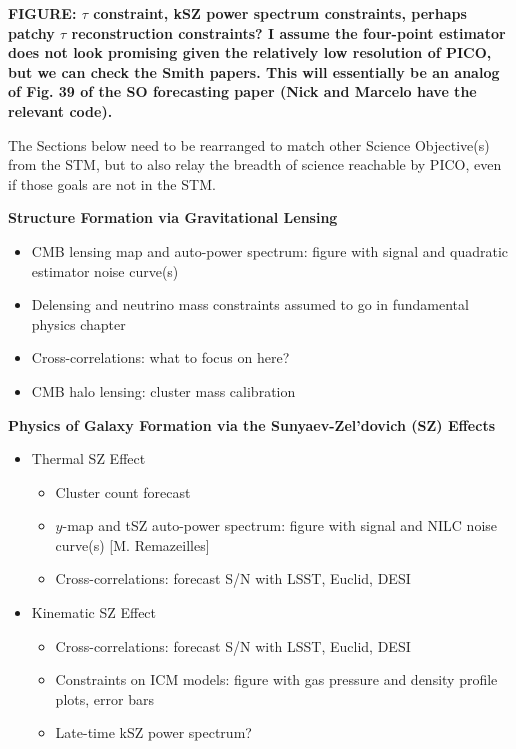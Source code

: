 \documentclass[PICOReport.tex]{subfiles}
\begin{document}
\textbf{FIGURE: $\tau$ constraint, kSZ power spectrum constraints, perhaps patchy $\tau$ reconstruction constraints? I assume the four-point estimator does not look promising given the relatively low resolution of PICO, but we can check the Smith papers.  This will essentially be an analog of Fig. 39 of the SO forecasting paper (Nick and Marcelo have the relevant code).}


The Sections below need to be rearranged to match other Science Objective(s) from the STM, but to also relay the 
breadth of science reachable by PICO, even if those goals are not in the STM. 

{\bf Structure Formation via Gravitational Lensing}
\begin{itemize}
\item CMB lensing map and auto-power spectrum: figure with signal and quadratic estimator noise curve(s)
\item Delensing and neutrino mass constraints assumed to go in fundamental physics chapter
\item Cross-correlations: what to focus on here?
\item CMB halo lensing: cluster mass calibration
\end{itemize}

{\bf Physics of Galaxy Formation via the Sunyaev-Zel'dovich (SZ) Effects}
\begin{itemize}
\item{Thermal SZ Effect}
\begin{itemize}
\item Cluster count forecast
\item{$y$-map and tSZ auto-power spectrum: figure with signal and NILC noise curve(s) [M. Remazeilles]}
\item Cross-correlations: forecast S/N with LSST, Euclid, DESI
\end{itemize}
\item Kinematic SZ Effect
\begin{itemize}
\item Cross-correlations: forecast S/N with LSST, Euclid, DESI
\item Constraints on ICM models: figure with gas pressure and density profile plots, error bars
\item Late-time kSZ power spectrum?
\end{itemize}
\end{itemize}
\end{document}
